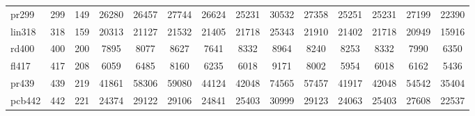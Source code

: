 \begin{table}[htbp]
{{\begin{tabular}{|l|c|c|c|c|c|c|c|c|c|c|c|c|c|}
pr299 & 299 & 149 & 26280 & 26457 & 27744 & 26624 & 25231 & 30532 & 27358 & 25251 & 25231 & 27199 & 22390 \\
lin318 & 318 & 159 & 20313 & 21127 & 21532 & 21405 & 21718 & 25343 & 21910 & 21402 & 21718 & 20949 & 15916 \\
rd400 & 400 & 200 & 7895 & 8077 & 8627 & 7641 & 8332 & 8964 & 8240 & 8253 & 8332 & 7990 & 6350 \\
fl417 & 417 & 208 & 6059 & 6485 & 8160 & 6235 & 6018 & 9171 & 8002 & 5954 & 6018 & 6162 & 5436 \\
pr439 & 439 & 219 & 41861 & 58306 & 59080 & 44124 & 42048 & 74565 & 57457 & 41917 & 42048 & 54542 & 35404 \\
pcb442 & 442 & 221 & 24374 & 29122 & 29106 & 24841 & 25403 & 30999 & 29123 & 24063 & 25403 & 27608 & 22537 \\
\hline
\end{tabular}}}
\end{table}

